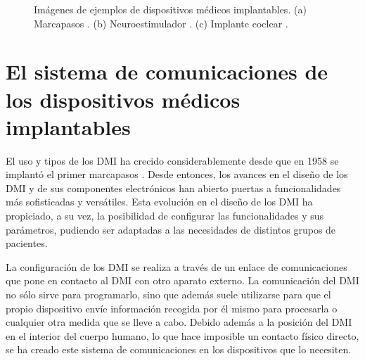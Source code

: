 \begin{figure}[!htb]
    \caption{Imágenes de ejemplos de dispositivos médicos implantables. (a) Marcapasos \cite{marcapasos}. (b) Neuroestimulador \cite{neuroestimulador}. (c) Implante coclear \cite{coclear}.}
    \label{fig:fig1.1}
\end{figure}


\section{El sistema de comunicaciones de los dispositivos médicos implantables}\label{sec:enlace}

El uso y tipos de los DMI ha crecido considerablemente desde que en 1958 se implantó el primer marcapasos \cite{brunckhorst}. Desde entonces, los avances en el diseño de los DMI y de sus componentes electrónicos han abierto puertas a funcionalidades más sofisticadas y versátiles. Esta evolución en el diseño de los DMI ha propiciado, a su vez, la posibilidad de configurar las funcionalidades y sus parámetros, pudiendo ser adaptadas a las necesidades de distintos grupos de pacientes.

La configuración de los DMI se realiza a través de un enlace de comunicaciones que pone en contacto al DMI con otro aparato externo. La comunicación del DMI no sólo sirve para programarlo, sino que además suele utilizarse para que el propio dispositivo envíe información recogida por él mismo para procesarla o cualquier otra medida que se lleve a cabo. Debido además a la posición del DMI en el interior del cuerpo humano, lo que hace imposible un contacto físico directo, se ha creado este sistema de comunicaciones en los dispositivos que lo necesiten.

